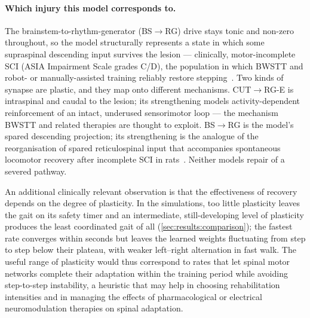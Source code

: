 \paragraph{Which injury this model corresponds to.}
The brainstem-to-rhythm-generator (BS$\to$RG) drive stays tonic and non-zero
throughout, so the model structurally represents a state in which some
supraspinal descending input survives the lesion --- clinically,
motor-incomplete SCI (ASIA Impairment Scale grades C/D), the population in
which BWSTT and robot- or manually-assisted training reliably restore
stepping~\cite{wernigMuller1992,dietz1998,behrmanHarkema2000}. Two kinds of
synapse are plastic, and they map onto different mechanisms. CUT$\to$RG-E is
intraspinal and caudal to the lesion; its strengthening models
activity-dependent reinforcement of an intact, underused sensorimotor loop ---
the mechanism BWSTT and related therapies are thought to exploit. BS$\to$RG is
the model's spared descending projection; its strengthening is the analogue of
the reorganisation of spared reticulospinal input that accompanies spontaneous
locomotor recovery after incomplete SCI in rats~\cite{ballermannFouad2006}.
Neither models repair of a severed pathway.

An additional clinically relevant observation is that the effectiveness of
recovery depends on the degree of plasticity. In the simulations, too little plasticity leaves the gait on its safety timer
and an intermediate, still-developing level of plasticity produces the least
coordinated gait of all (\autoref{sec:results:comparison}); the fastest rate
converges within seconds but leaves the learned weights fluctuating from step
to step below their plateau, with weaker left--right alternation in fast walk.
The useful range of plasticity would thus correspond to rates that let spinal
motor networks complete their adaptation within the training period while
avoiding step-to-step instability, a heuristic that may help in choosing
rehabilitation intensities and in managing the effects of pharmacological or
electrical neuromodulation therapies on spinal adaptation.

